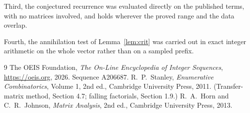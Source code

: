 \documentclass[11pt,a4paper]{article}
\theoremstyle{plain}
\theoremstyle{definition}
\begin{document}
Third, the conjectured recurrence was evaluated directly on the published terms, with no
matrices involved, and holds wherever the proved range and the data overlap.

Fourth, the annihilation test of Lemma~\ref{lem:crit} was carried out in exact integer
arithmetic on the whole vector rather than on a sampled prefix.

\begin{thebibliography}{9}
 The OEIS Foundation, \emph{The On-Line Encyclopedia of Integer
Sequences}, \url{https://oeis.org}, 2026. Sequence A206687.
 R.~P.~Stanley, \emph{Enumerative Combinatorics}, Volume 1, 2nd ed.,
Cambridge University Press, 2011. (Transfer-matrix method, Section 4.7; falling factorials,
Section 1.9.)
 R.~A.~Horn and C.~R.~Johnson, \emph{Matrix Analysis}, 2nd ed., Cambridge
University Press, 2013.
\end{thebibliography}
\end{document}
